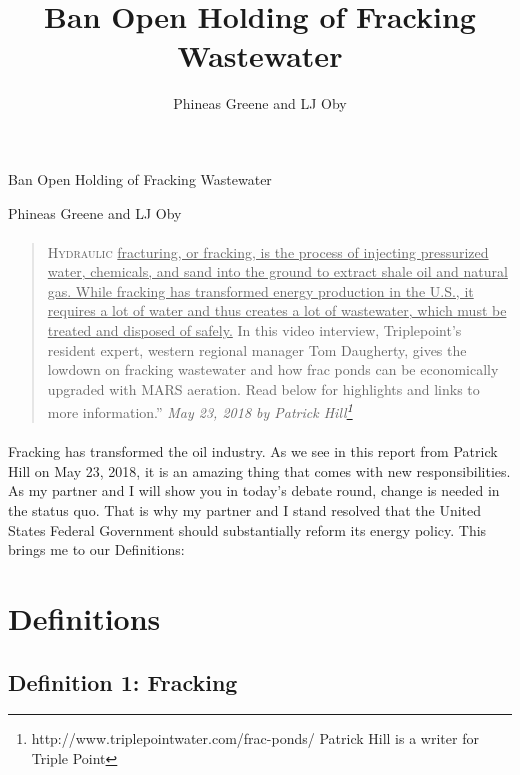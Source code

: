 \documentclass[11pt]{article}
\title{Ban Open Holding of Fracking Wastewater}
\author{Phineas Greene and LJ Oby}
\begin{document}
	\begin{center}
	\huge
	Ban Open Holding of Fracking Wastewater
	\end{center}
	\begin{center}
	\large
	Phineas Greene and LJ Oby
	\end{center}
	
	\begin{center}
	\end{center}
	
	\paragraph{}
	\begin{quotation}
	\lettrine{H}{ydraulic} \ul{fracturing, or fracking, is the process of injecting pressurized water, chemicals, and sand into the ground to extract shale oil and natural gas. While fracking has transformed energy production in the U.S., it requires a lot of water and thus creates a lot of wastewater, which must be treated and disposed of safely.} In this video interview, Triplepoint’s resident expert, western regional manager Tom Daugherty, gives the lowdown on fracking wastewater and how frac ponds can be economically upgraded with MARS aeration. Read below for highlights and links to more information.''
	\textit{May 23, 2018 by Patrick Hill\footnote{http://www.triplepointwater.com/frac-ponds/ Patrick Hill is a writer for Triple Point}}
	\end{quotation}
	
	
	\paragraph{}
	Fracking has transformed the oil industry. As we see in this report from Patrick Hill on May 23, 2018, it is an amazing thing that comes with new responsibilities. As my partner and I will show you in today’s debate round, change is needed in the status quo. That is why my partner and I stand resolved that the United States Federal Government should substantially reform its energy policy. This brings me to our Definitions:

	\section{Definitions}
	
	\subsection{Definition 1: Fracking}
\end{document}
